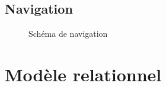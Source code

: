 \documentclass[letterpaper,10pt,oneside]{sphinxmanual}
\begin{document}
\section{Navigation}
\label{schemas:navigation}\begin{figure}[htbp]
\centering
\capstart

\caption{Schéma de navigation}\end{figure}


\chapter{Modèle relationnel}
\label{models::doc}\label{models:modele-relationnel}
\end{document}
